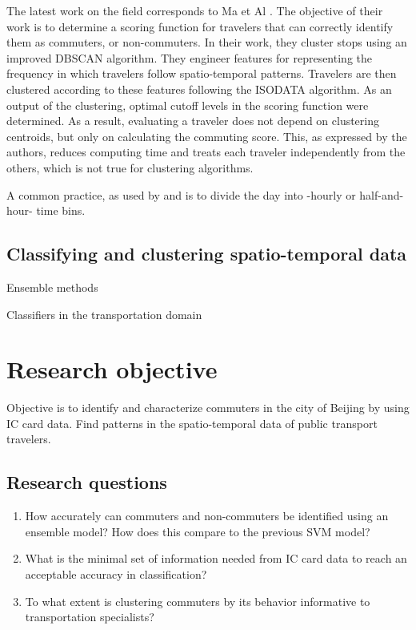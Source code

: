\documentclass{article}
\begin{document}
The latest work on the field corresponds to Ma et Al \cite{ma2017understanding}. The objective of their work is to determine a scoring function for travelers that can correctly identify them as commuters, or non-commuters. In their work, they cluster stops using an improved DBSCAN algorithm. They engineer features for representing the frequency in which travelers follow spatio-temporal patterns. Travelers are then clustered according to these features following the ISODATA algorithm. As an output of the clustering, optimal cutoff levels in the scoring function were determined. As a result, evaluating a traveler does not depend on clustering centroids, but only on calculating the commuting score. This, as expressed by the authors, reduces computing time and treats each traveler independently from the others, which is not true for clustering algorithms.

A common practice, as used by \cite{ma2017understanding} and \cite{langlois2016inferring} is to divide the day into -hourly or half-and-hour- time bins.

\subsection{Classifying and clustering spatio-temporal data}
Ensemble methods

Classifiers in the transportation domain


\newpage
\section{Research objective}
Objective is to identify and characterize commuters in the city of Beijing by using IC card data. Find patterns in the spatio-temporal data of public transport travelers. 

\subsection{Research questions}
\begin{enumerate}
\item How accurately can commuters and non-commuters be identified using an ensemble model? How does this compare to the previous SVM model?
\item What is the minimal set of information needed from IC card data to reach an acceptable accuracy in classification?
\item To what extent is clustering commuters by its behavior informative to transportation specialists? 
\end{enumerate}
\end{document}
